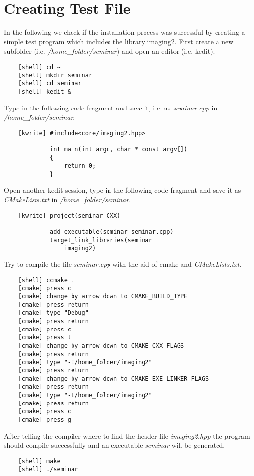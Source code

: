 \documentclass[a4paper,10pt]{article}
\begin{document}
\section{Creating Test File}
In the following we check if the installation process was successful by creating a simple test program which
includes the library imaging2. First create a new subfolder (i.e. \emph{/home\_folder/seminar}) and open an
editor (i.e. kedit).
\begin{verbatim}
    [shell] cd ~
    [shell] mkdir seminar
    [shell] cd seminar
    [shell] kedit &
\end{verbatim}
Type in the following code fragment and save it, i.e. as \emph{seminar.cpp} in \emph{/home\_folder/seminar}.
\begin{verbatim}
    [kwrite] #include<core/imaging2.hpp>

             int main(int argc, char * const argv[])
             {
                 return 0;
             }
\end{verbatim}
Open another kedit session, type in the following code fragment and save it as \emph{CMakeLists.txt} in
\emph{/home\_folder/seminar}.
\begin{verbatim}
    [kwrite] project(seminar CXX)

             add_executable(seminar seminar.cpp)
             target_link_libraries(seminar
                 imaging2)
\end{verbatim}
Try to compile the file \emph{seminar.cpp} with the aid of cmake and \emph{CMakeLists.txt}.
\begin{verbatim}
    [shell] ccmake .
    [cmake] press c
    [cmake] change by arrow down to CMAKE_BUILD_TYPE
    [cmake] press return
    [cmake] type "Debug"
    [cmake] press return
    [cmake] press c
    [cmake] press t
    [cmake] change by arrow down to CMAKE_CXX_FLAGS
    [cmake] press return
    [cmake] type "-I/home_folder/imaging2"
    [cmake] press return
    [cmake] change by arrow down to CMAKE_EXE_LINKER_FLAGS
    [cmake] press return
    [cmake] type "-L/home_folder/imaging2"
    [cmake] press return
    [cmake] press c
    [cmake] press g
\end{verbatim}
After telling the compiler where to find the header file \emph{imaging2.hpp} the program should compile successfully and an executable \emph{seminar} will be generated.
\begin{verbatim}
    [shell] make
    [shell] ./seminar
\end{verbatim}
\end{document}
